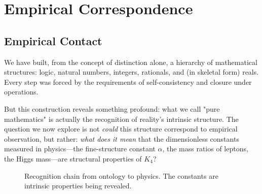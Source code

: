 \documentclass[11pt,a4paper]{book}
\begin{document}
\part{Empirical Correspondence}

\chapter{Empirical Contact}

We have built, from the concept of distinction alone, a hierarchy of mathematical structures: 
logic, natural numbers, integers, rationals, and (in skeletal form) reals. Every step was 
forced by the requirements of self-consistency and closure under operations.

But this construction reveals something profound: what we call "pure mathematics" is actually 
the recognition of reality's intrinsic structure. The question we now explore is not \emph{could} this 
structure correspond to empirical observation, but rather: \emph{what does it mean} that the 
dimensionless constants measured in physics—the fine-structure constant $\alpha$, the mass ratios 
of leptons, the Higgs mass—are structural properties of $K_4$?

\begin{figure}[h]
\centering
{}
\caption{Recognition chain from ontology to physics. The constants are intrinsic properties being revealed.}
\label{fig:ontology-chain}
\end{figure}
\end{document}
